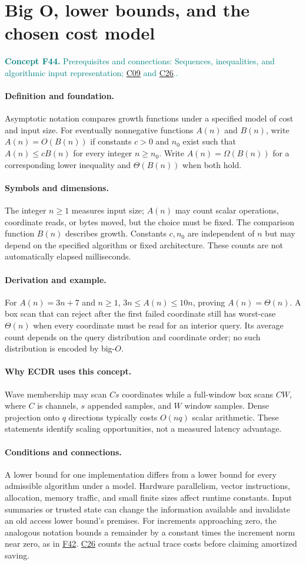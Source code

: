 \documentclass[11pt,a4paper]{article}
\newcommand{\conceptid}{Front matter}
\newcommand{\concept}[3]{\clearpage\renewcommand{\conceptid}{#1}%
\section{#2}\label{concept:#1}%
\textcolor{teal}{\textbf{Concept #1.} Prerequisites and connections: #3.}\par
\typeout{ECDR-CONCEPT-START #1 PAGE=\thepage}}
\begin{document}
\concept{F44}{Big O, lower bounds, and the chosen cost model}{Sequences, inequalities, and algorithmic input representation; \hyperref[concept:C09]{C09} and \hyperref[concept:C26]{C26}.}
\paragraph{Definition and foundation.}
Asymptotic notation compares growth functions under a specified model of cost and input size. For eventually nonnegative functions $A(n)$ and $B(n)$, write $A(n)=O(B(n))$ if constants $c>0$ and $n_0$ exist such that $A(n)\le cB(n)$ for every integer $n\ge n_0$. Write $A(n)=\Omega(B(n))$ for a corresponding lower inequality and $\Theta(B(n))$ when both hold.
\paragraph{Symbols and dimensions.}
The integer $n\ge1$ measures input size; $A(n)$ may count scalar operations, coordinate reads, or bytes moved, but the choice must be fixed. The comparison function $B(n)$ describes growth. Constants $c,n_0$ are independent of $n$ but may depend on the specified algorithm or fixed architecture. These counts are not automatically elapsed milliseconds.
\paragraph{Derivation and example.}
For $A(n)=3n+7$ and $n\ge1$, $3n\le A(n)\le10n$, proving $A(n)=\Theta(n)$. A box scan that can reject after the first failed coordinate still has worst-case $\Theta(n)$ when every coordinate must be read for an interior query. Its average count depends on the query distribution and coordinate order; no such distribution is encoded by big-$O$.
\paragraph{Why ECDR uses this concept.}
Wave membership may scan $Cs$ coordinates while a full-window box scans $CW$, where $C$ is channels, $s$ appended samples, and $W$ window samples. Dense projection onto $q$ directions typically costs $O(nq)$ scalar arithmetic. These statements identify scaling opportunities, not a measured latency advantage.
\paragraph{Conditions and connections.}
A lower bound for one implementation differs from a lower bound for every admissible algorithm under a model. Hardware parallelism, vector instructions, allocation, memory traffic, and small finite sizes affect runtime constants. Input summaries or trusted state can change the information available and invalidate an old access lower bound's premises. For increments approaching zero, the analogous notation bounds a remainder by a constant times the increment norm near zero, as in \hyperref[concept:F42]{F42}. \hyperref[concept:C26]{C26} counts the actual trace costs before claiming amortized saving.
\par\label{endconcept:F44}
\end{document}
